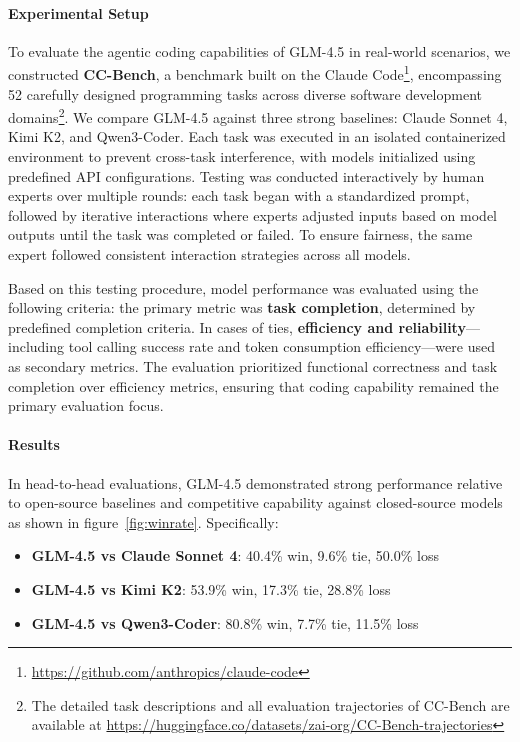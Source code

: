 \paragraph{Experimental Setup} To evaluate the agentic coding capabilities of GLM-4.5 in real-world scenarios, we constructed \textbf{CC-Bench}, a benchmark built on the Claude Code\footnote{\url{https://github.com/anthropics/claude-code}}, encompassing 52 carefully designed programming tasks across diverse software development domains\footnote{The detailed task descriptions and all evaluation trajectories of CC-Bench are available at \url{https://huggingface.co/datasets/zai-org/CC-Bench-trajectories}}. We compare GLM-4.5 against three strong baselines: Claude Sonnet 4, Kimi K2, and Qwen3-Coder.
Each task was executed in an isolated containerized environment to prevent cross-task interference, with models initialized using predefined API configurations. Testing was conducted interactively by human experts over multiple rounds: each task began with a standardized prompt, followed by iterative interactions where experts adjusted inputs based on model outputs until the task was completed or failed. To ensure fairness, the same expert followed consistent interaction strategies across all models.

Based on this testing procedure, model performance was evaluated using the following criteria: the primary metric was \textbf{task completion}, determined by predefined completion criteria. In cases of ties, \textbf{efficiency and reliability}—including tool calling success rate and token consumption efficiency—were used as secondary metrics. The evaluation prioritized functional correctness and task completion over efficiency metrics, ensuring that coding capability remained the primary evaluation focus.

\paragraph{Results} In head-to-head evaluations, GLM-4.5 demonstrated strong performance relative to open-source baselines and competitive capability against closed-source models as shown in figure~\ref{fig:winrate}. Specifically:

\begin{itemize}
  \item \textbf{GLM-4.5 vs Claude Sonnet 4}: 40.4\% win, 9.6\% tie, 50.0\% loss
  \item \textbf{GLM-4.5 vs Kimi K2}: 53.9\% win, 17.3\% tie, 28.8\% loss
  \item \textbf{GLM-4.5 vs Qwen3-Coder}: 80.8\% win, 7.7\% tie, 11.5\% loss
\end{itemize}

